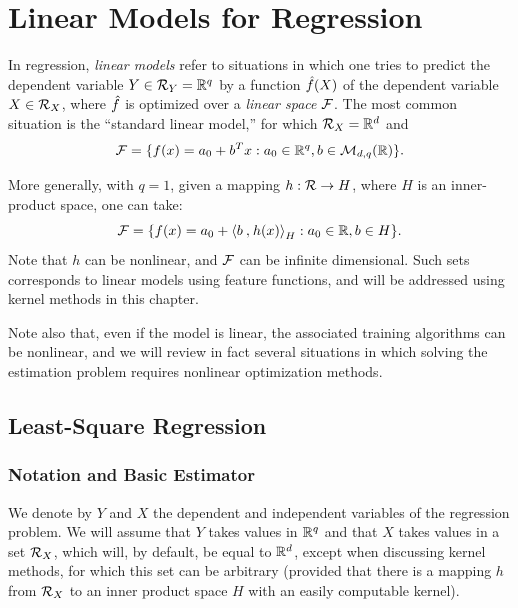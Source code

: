 




\chapter[Linear Regression]{Linear Models for Regression}
\label{chap:lin.reg}

In  regression, {\em linear models}  refer to situations in which one tries to predict the dependent variable $Y\in {\mathcal R}_Y = {\mathbb{R}}^{q}$ by a function ${\hat{f}}(X)$ of the dependent variable $X\in {\mathcal R}_X$, where  ${\hat{f}}$ is optimized over a {\em linear space} ${\mathcal F}$. 
The most common situation is the ``standard linear model,'' for which ${\mathcal R}_X = {\mathbb{R}}^d$ and%
\begin{equation}
\label{eq:cf.linear}
{\mathcal F} = \{ f(x) = {a_0} + b^{T}x: {a_0}\in {\mathbb{R}}^{q}, b\in {\mathcal M}_{d,q}({\mathbb{R}})\}.  
\end{equation}

More generally, with $q=1$, given a mapping $h : {\mathcal R} \to H$, where $H$ is an inner-product space, one can take:
\begin{equation}
\label{eq:cf.feature}
{\mathcal F} = \{ f(x) = {a_0} + {\langle {b}\mathbin{,} {h(x)}\rangle}_{H}: {a_0}\in {\mathbb{R}}, b\in H\}.  
\end{equation}
Note that $h$ can be nonlinear, and ${\mathcal F}$ can be infinite dimensional. Such sets corresponds to linear models using feature functions, and will be addressed using kernel methods in this chapter.

Note also that, even if the model is linear, the associated training algorithms can be nonlinear, and we
will review in fact several situations in which solving the estimation problem requires nonlinear optimization methods. 



\section{Least-Square  Regression}
\subsection{Notation and Basic Estimator}
We denote by $Y$ and $X$ the dependent and independent variables of the regression problem. We will assume that $Y$ takes values in  ${\mathbb{R}}^q$ and that $X$ takes values in a set ${\mathcal R}_X$, which will, by default, be equal to ${\mathbb{R}}^d$, except when discussing kernel methods, for which this set can be arbitrary (provided that there is a mapping $h$ from ${\mathcal R}_X$ to  an inner product space $H$ with an easily computable kernel). 
 
